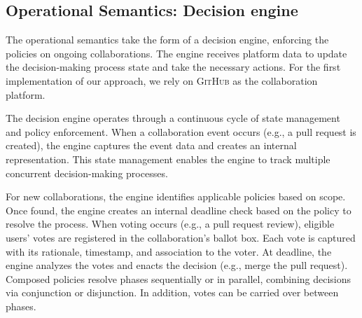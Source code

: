 \subsection{Operational Semantics: Decision engine}
The operational semantics take the form of a decision engine, enforcing the policies on ongoing collaborations.
The engine receives platform data to update the decision-making process state and take the necessary actions.
For the first implementation of our approach, we rely on \textsc{GitHub} as the collaboration platform.

The decision engine operates through a continuous cycle of state management and policy enforcement. 
When a collaboration event occurs (e.g., a pull request is created), the engine captures the event data and creates an internal representation. %
This state management enables the engine to track multiple concurrent decision-making processes.

For new collaborations, the engine identifies applicable policies based on scope.
Once found, the engine creates an internal deadline check based on the policy to resolve the 
process.
When voting occurs (e.g., a pull request review), 
eligible users' votes are registered in the collaboration's ballot box.
Each vote is captured with its rationale, timestamp, and association to the voter. %
At deadline, the engine analyzes the votes 
and enacts the decision (e.g., merge the pull request).
Composed policies resolve phases
sequentially or in parallel, 
combining decisions via conjunction or disjunction.
In addition, 
votes can be carried over between phases.


